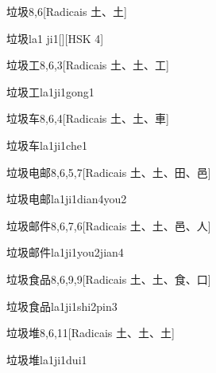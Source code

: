 \begin{entry}{垃圾}{8,6}[Radicais ⼟、⼟]
  \begin{phonetics}{垃圾}{la1 ji1}[][HSK 4]
  \end{phonetics}
\end{entry}

\begin{entry}{垃圾工}{8,6,3}[Radicais ⼟、⼟、⼯]
  \begin{phonetics}{垃圾工}{la1ji1gong1}
  \end{phonetics}
\end{entry}

\begin{entry}{垃圾车}{8,6,4}[Radicais ⼟、⼟、⾞]
  \begin{phonetics}{垃圾车}{la1ji1che1}
  \end{phonetics}
\end{entry}

\begin{entry}{垃圾电邮}{8,6,5,7}[Radicais ⼟、⼟、⽥、⾢]
  \begin{phonetics}{垃圾电邮}{la1ji1dian4you2}
  \end{phonetics}
\end{entry}

\begin{entry}{垃圾邮件}{8,6,7,6}[Radicais ⼟、⼟、⾢、⼈]
  \begin{phonetics}{垃圾邮件}{la1ji1you2jian4}
  \end{phonetics}
\end{entry}

\begin{entry}{垃圾食品}{8,6,9,9}[Radicais ⼟、⼟、⾷、⼝]
  \begin{phonetics}{垃圾食品}{la1ji1shi2pin3}
  \end{phonetics}
\end{entry}

\begin{entry}{垃圾堆}{8,6,11}[Radicais ⼟、⼟、⼟]
  \begin{phonetics}{垃圾堆}{la1ji1dui1}
  \end{phonetics}
\end{entry}

